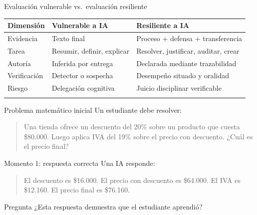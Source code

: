 \documentclass[
  ignorenonframetext,
  aspectratio=169,
  spanish,
]{beamer}
\newcounter{none} %
\begin{document}
\begin{frame}{Evaluación vulnerable vs.~evaluación resiliente}
\protect{}\label{evaluaciuxf3n-vulnerable-vs.-evaluaciuxf3n-resiliente}
{\def\LTcaptype{none} %
\begin{longtable}[]{@{}
  >{\raggedright\arraybackslash}p{}
  >{\raggedright\arraybackslash}p{}
  >{\raggedright\arraybackslash}p{}@{}}
\toprule\noalign{}
\begin{minipage}[b]{\linewidth}\raggedright
Dimensión
\end{minipage} & \begin{minipage}[b]{\linewidth}\raggedright
Vulnerable a IA
\end{minipage} & \begin{minipage}[b]{\linewidth}\raggedright
Resiliente a IA
\end{minipage} \\
\midrule\noalign{}
\endhead
Evidencia & Texto final & Proceso + defensa + transferencia \\
Tarea & Resumir, definir, explicar & Resolver, justificar, auditar,
crear \\
Autoría & Inferida por entrega & Declarada mediante trazabilidad \\
Verificación & Detector o sospecha & Desempeño situado y oralidad \\
Riesgo & Delegación cognitiva & Juicio disciplinar verificable \\
\bottomrule\noalign{}
\end{longtable}
}
\end{frame}

\begin{frame}{Problema matemático inicial}
\protect{}\label{problema-matemuxe1tico-inicial}
Un estudiante debe resolver:

\begin{quote}
Una tienda ofrece un descuento del 20\% sobre un producto que cuesta
\$80.000. Luego aplica IVA del 19\% sobre el precio con descuento. ¿Cuál
es el precio final?
\end{quote}
\end{frame}

\begin{frame}{Momento 1: respuesta correcta}
\protect{}\label{momento-1-respuesta-correcta}
Una IA responde:

\begin{quote}
El descuento es \$16.000. El precio con descuento es \$64.000. El IVA es
\$12.160. El precio final es \$76.160.
\end{quote}

\begin{block}{Pregunta}
\protect{}\label{pregunta}
¿Esta respuesta demuestra que el estudiante aprendió?
\end{block}
\end{frame}
\end{document}
